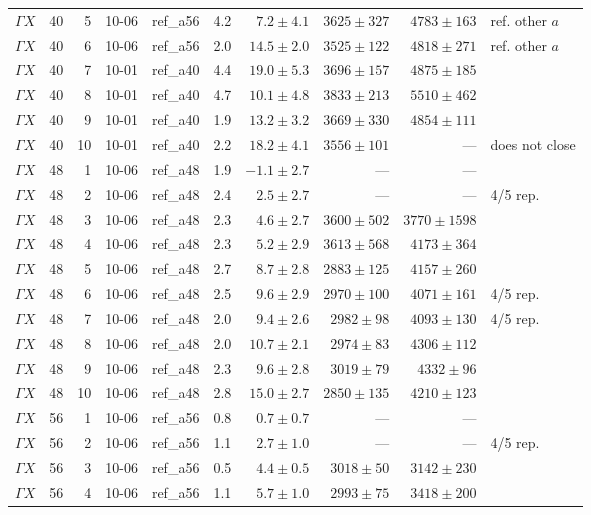 \documentclass[9pt,a4paper,twocolumn]{extarticle}
\begin{document}
\begin{table}[h]
\begin{tabular}{llrlcrrrrl}
$\Gamma X$ & 40 & 5 & 10-06 & ref\_a56 & 4.2 & $7.2\pm4.1$ & $3625\pm327$ & $4783\pm163$ & ref. other $a$ \\
$\Gamma X$ & 40 & 6 & 10-06 & ref\_a56 & 2.0 & $14.5\pm2.0$ & $3525\pm122$ & $4818\pm271$ & ref. other $a$ \\
$\Gamma X$ & 40 & 7 & 10-01 & ref\_a40 & 4.4 & $19.0\pm5.3$ & $3696\pm157$ & $4875\pm185$ &  \\
$\Gamma X$ & 40 & 8 & 10-01 & ref\_a40 & 4.7 & $10.1\pm4.8$ & $3833\pm213$ & $5510\pm462$ &  \\
$\Gamma X$ & 40 & 9 & 10-01 & ref\_a40 & 1.9 & $13.2\pm3.2$ & $3669\pm330$ & $4854\pm111$ &  \\
$\Gamma X$ & 40 & 10 & 10-01 & ref\_a40 & 2.2 & $18.2\pm4.1$ & $3556\pm101$ & --- & does not close \\
\midrule
$\Gamma X$ & 48 & 1 & 10-06 & ref\_a48 & 1.9 & $-1.1\pm2.7$ & --- & --- &  \\
$\Gamma X$ & 48 & 2 & 10-06 & ref\_a48 & 2.4 & $2.5\pm2.7$ & --- & --- & 4/5 rep. \\
$\Gamma X$ & 48 & 3 & 10-06 & ref\_a48 & 2.3 & $4.6\pm2.7$ & $3600\pm502$ & $3770\pm1598$ &  \\
$\Gamma X$ & 48 & 4 & 10-06 & ref\_a48 & 2.3 & $5.2\pm2.9$ & $3613\pm568$ & $4173\pm364$ &  \\
$\Gamma X$ & 48 & 5 & 10-06 & ref\_a48 & 2.7 & $8.7\pm2.8$ & $2883\pm125$ & $4157\pm260$ &  \\
$\Gamma X$ & 48 & 6 & 10-06 & ref\_a48 & 2.5 & $9.6\pm2.9$ & $2970\pm100$ & $4071\pm161$ & 4/5 rep. \\
$\Gamma X$ & 48 & 7 & 10-06 & ref\_a48 & 2.0 & $9.4\pm2.6$ & $2982\pm98$ & $4093\pm130$ & 4/5 rep. \\
$\Gamma X$ & 48 & 8 & 10-06 & ref\_a48 & 2.0 & $10.7\pm2.1$ & $2974\pm83$ & $4306\pm112$ &  \\
$\Gamma X$ & 48 & 9 & 10-06 & ref\_a48 & 2.3 & $9.6\pm2.8$ & $3019\pm79$ & $4332\pm96$ &  \\
$\Gamma X$ & 48 & 10 & 10-06 & ref\_a48 & 2.8 & $15.0\pm2.7$ & $2850\pm135$ & $4210\pm123$ &  \\
\midrule
$\Gamma X$ & 56 & 1 & 10-06 & ref\_a56 & 0.8 & $0.7\pm0.7$ & --- & --- &  \\
$\Gamma X$ & 56 & 2 & 10-06 & ref\_a56 & 1.1 & $2.7\pm1.0$ & --- & --- & 4/5 rep. \\
$\Gamma X$ & 56 & 3 & 10-06 & ref\_a56 & 0.5 & $4.4\pm0.5$ & $3018\pm50$ & $3142\pm230$ &  \\
$\Gamma X$ & 56 & 4 & 10-06 & ref\_a56 & 1.1 & $5.7\pm1.0$ & $2993\pm75$ & $3418\pm200$ &  \\

\end{tabular}
\end{table}
\end{document}
